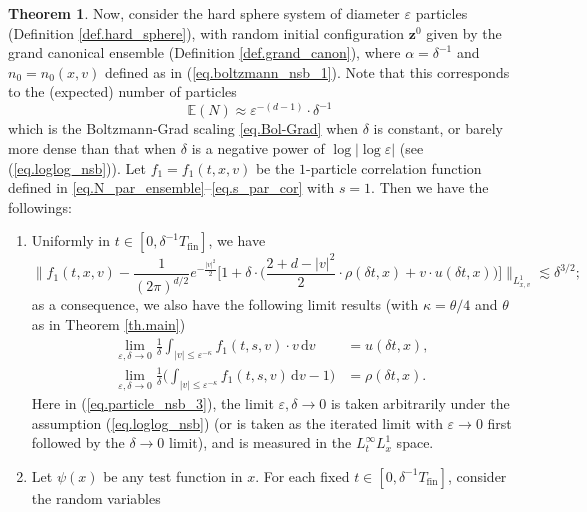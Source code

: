\documentclass[10pt, reqno]{amsart}
\newcommand{\Eb}{\mathbb E}
\newcommand{\vz}{\boldsymbol{z}}
\theoremstyle{definition}
\newtheorem{mainthm}{Theorem}
\theoremstyle{remark}
\numberwithin{equation}{section}
\begin{document}
\begin{mainthm}
Now, consider the hard sphere system of diameter $\varepsilon$ particles (Definition \ref{def.hard_sphere}), with random initial configuration $\vz^0$ given by the grand canonical ensemble (Definition \ref{def.grand_canon}), where $\alpha=\delta^{-1}$ and $n_0=n_0(x,v)$ defined as in (\ref{eq.boltzmann_nsb_1}). Note that this corresponds to the (expected) number of particles
\begin{equation}\label{eq.particle_nsb_1}\Eb(N)\approx \varepsilon^{-(d-1)}\cdot\delta^{-1}
\end{equation} which is the Boltzmann-Grad scaling \eqref{eq.Bol-Grad} when $\delta$ is constant, or barely more dense than that when {$\delta$ is a negative power of $\log|\log\varepsilon|$} (see (\ref{eq.loglog_nsb})). Let $f_1=f_1(t,x,v)$ be the $1$-particle correlation function defined in \eqref{eq.N_par_ensemble}--\eqref{eq.s_par_cor} with $s=1$. Then we have the followings:
\begin{enumerate}
\item Uniformly in $t\in[0,{\delta^{-1}T_{\mathrm{fin}}}]$, we have
\begin{equation}\label{eq.particle_nsb_2}
\bigg\|f_1(t,x,v)-\frac{1}{(2\pi)^{d/2}}e^{-\frac{|v|^2}{2}}\bigg[1+\delta\cdot\bigg(\frac{2+d-|v|^2}{2}\cdot\rho({\delta t},x)+v\cdot u({\delta t},x)\bigg)\bigg]\bigg\|_{L_{x,v}^1}\lesssim\delta^{3/2};
\end{equation} as a consequence, we also have the following limit results (with $\kappa=\theta/4$ and $\theta$ as in Theorem \ref{th.main})
\begin{equation}\label{eq.particle_nsb_3}
\begin{aligned}\lim_{\varepsilon,\delta\to 0}\frac{1}{\delta}\int_{|v|\leq \varepsilon^{-\kappa}}f_1(t,s,v)\cdot v\,\mathrm{d}v&=u({\delta t},x),\\
\lim_{\varepsilon,\delta\to 0}\frac{1}{\delta}\bigg(\int_{|v|\leq \varepsilon^{-\kappa}}f_1(t,s,v)\,\mathrm{d}v-1\bigg)&=\rho({\delta t},x).
\end{aligned}
\end{equation}
Here in (\ref{eq.particle_nsb_3}), the limit $\varepsilon,\delta\to 0$ is taken arbitrarily under the assumption (\ref{eq.loglog_nsb}) (or is taken as the iterated limit with $\varepsilon\to 0$ first followed by the $\delta\to 0$ limit), and is measured in the $L_t^\infty L_x^1$ space.
\item Let $\psi(x)$ be any test function in $x$. For each fixed $t\in[0,{\delta^{-1}T_{\mathrm{fin}}}]$, consider the random variables
\begin{equation}\label{eq.empirical_1}\begin{aligned}

\end{aligned}
\end{equation}
\end{enumerate}
\end{mainthm}
\end{document}
